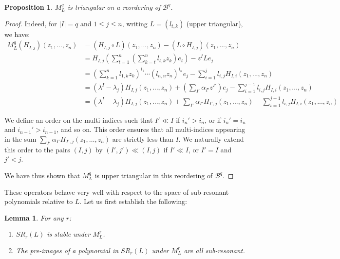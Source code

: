 \documentclass[english,11pt]{amsart}
\newtheorem{lemma}[theorem]{Lemma}
\newtheorem{proposition}[theorem]{Proposition}
\theoremstyle{definition}
\theoremstyle{remark}
\numberwithin{equation}{section}
\begin{document}
\begin{proposition}\label{p:triang}
$M_L^q$ is triangular on a reordering of $\mathcal{B}^q$.
\end{proposition}
\begin{proof}
Indeed, for $|I| = q$ and $1 \leq j \leq n$, writing $L=(l_{t,k})$ (upper triangular), we have:
\begin{align*}
    M_L^q(H_{I,j})(z_1, ...,z_n) &= (H_{I,j} \circ L)(z_1, ...,z_n) - (L\circ H_{I,j}) (z_1, ...,z_n) \\
    &= H_{I,j}\left( \sum_{t=1}^n \left(\sum_{k=t}^n l_{t,k}z_k\right)e_t\right)-z^I Le_j \\
    &= \left(\sum_{k=1}^n l_{1,k}z_k\right)^{i_1}\cdots\left(l_{n,n}z_n\right)^{i_n}e_j - \sum_{i=1}^{j}l_{i,j}H_{I,i}(z_1, ...,z_n) \\
    &= (\lambda^I - \lambda_j)H_{I,j}(z_1, ...,z_n) + \left(\sum_{I'} \alpha_{I'}z^{I'}\right)e_j - \sum_{i=1}^{j-1}l_{i,j}H_{I,i}(z_1, ...,z_n) \\
    &= (\lambda^I - \lambda_j)H_{I,j}(z_1, ...,z_n) + \sum_{I'} \alpha_{I'}H_{I',j}(z_1, ...,z_n)- \sum_{i=1}^{j-1}l_{i,j}H_{I,i}(z_1, ...,z_n)
\end{align*}

We define an order on the multi-indices such that $I' \ll I$ if $i_n' > i_n$, or if $i_n' = i_n$ and $i_{n-1}' > i_{n-1}$, and so on. This order ensures that all multi-indices appearing in the sum $\sum_{I'} \alpha_{I'} H_{I',j}(z_1, \dots, z_n)$ are strictly less than $I$. We naturally extend this order to the pairs $(I, j)$ by $(I', j') \ll (I, j)$ if $I' \ll I$, or $I' = I$ and $j' < j$.

We have thus shown that $M_L^q$ is upper triangular in this reordering of $\mathcal{B}^q$.
\end{proof}

These operators behave very well with respect to the space of sub-resonant polynomials relative to $L$. Let us first establish the following:

\begin{lemma}\label{l:stable&ante}
For any $r$:
\begin{enumerate}
    \item $SR_r(L)$ is stable under $M_L^r$.
    \item The pre-images of a polynomial in $SR_r(L)$ under $M_L^r$ are all sub-resonant.
\end{enumerate}
\end{lemma}
\end{document}
